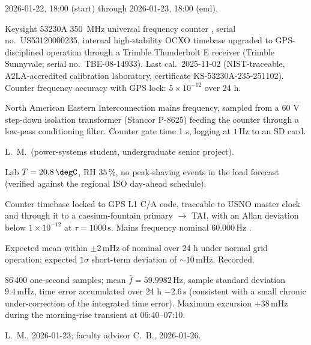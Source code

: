 \begin{description}[leftmargin=2em, itemsep=2pt]
  \item[Date / time.] 2026-01-22, 18{:}00 (start) through 2026-01-23,
    18{:}00 (end).
  \item[Instrument.] Keysight 53230A 350~MHz universal frequency
    counter \cite{web:ch01t3-keysight-53230A}, serial no.\
    US53120000235, internal high-stability OCXO timebase upgraded to
    GPS-disciplined operation through a Trimble Thunderbolt E
    receiver (Trimble Sunnyvale; serial no.\ TBE-08-14933).
    Last cal.\ 2025-11-02 (NIST-traceable, A2LA-accredited
    calibration laboratory, certificate KS-53230A-235-251102).
    Counter frequency accuracy with GPS lock: $5 \times 10^{-12}$
    over 24 h.
  \item[Measurand and setup.] North American Eastern Interconnection
    mains frequency, sampled from a 60 \si{\volt} step-down isolation
    transformer (Stancor P-8625) feeding the counter through a
    low-pass conditioning filter. Counter gate time 1 s, logging at
    $1 \,\si{\hertz}$ to an SD card.
  \item[Operator.] L.~M.~(power-systems student, undergraduate
    senior project).
  \item[Conditions.] Lab $T = 20.8 \,\degC$, RH
    $35 \,\si{\percent}$, no peak-shaving events in the load
    forecast (verified against the regional ISO day-ahead schedule).
  \item[Provenance of reference.] Counter timebase locked to GPS L1
    C/A code, traceable to USNO master clock and through it to a
    caesium-fountain primary $\to$ TAI, with an Allan deviation
    below $1 \times 10^{-12}$ at $\tau = 1000 \,\si{\second}$. Mains
    frequency nominal $60.000 \,\si{\hertz}$
    \cite{web:ch01t3-nerc-mains-frequency}.
  \item[Estimate before reading.] Expected mean within
    $\pm 2 \,\si{\milli\hertz}$ of nominal over 24 h under normal
    grid operation; expected $1\sigma$ short-term deviation of
    $\sim 10 \,\si{\milli\hertz}$. Recorded.
  \item[Reading.] 86\,400 one-second samples; mean
    $\bar f = 59.9982 \,\si{\hertz}$, sample standard deviation
    $9.4 \,\si{\milli\hertz}$, time error accumulated over 24 h
    $-2.6 \,\si{\second}$ (consistent with a small chronic
    under-correction of the integrated time error). Maximum
    excursion $+38 \,\si{\milli\hertz}$ during the morning-rise
    transient at 06{:}40--07{:}10.
  \item[Signature.] L.~M., 2026-01-23; faculty advisor C.~B.,
    2026-01-26.
\end{description}

